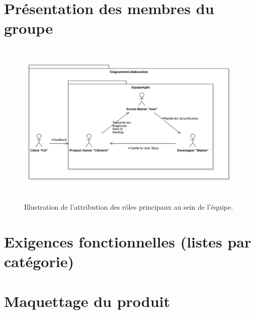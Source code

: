 \documentclass[12pt,a4paper]{scrartcl}
\theoremstyle{plain}
\theoremstyle{definition}
\theoremstyle{remark}
\begin{document}
	
	
	\tableofcontents
	
	
	
	
	\section{Présentation des membres du groupe}
	
	\begin{figure}[h]
		\centering
		\includegraphics[height=8cm]{img/diagCollaboration.png} 
		\caption{Illustration de l'attribution des rôles principaux au sein de l'équipe.}
	\end{figure}
	
	
	
	\section{Exigences fonctionnelles (listes par catégorie)}
	
	
	\section{Maquettage du produit}
\end{document}
